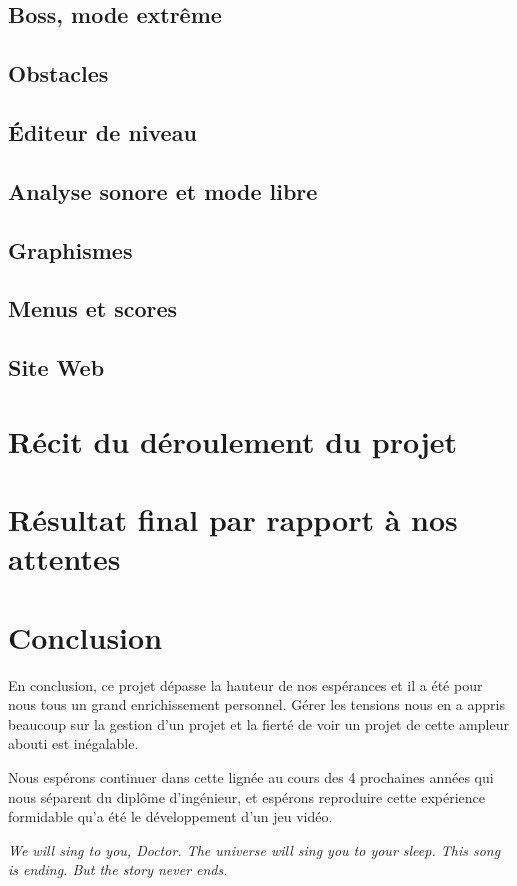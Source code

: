 \documentclass[12pt,a4paper]{article}
\begin{document}
		\subsection{Boss, mode extrême}
			
		\subsection{Obstacles}
			
		\subsection{Éditeur de niveau}
			
		\subsection{Analyse sonore et mode libre}
			
		\subsection{Graphismes}
			
		\subsection{Menus et scores}
			
		\subsection{Site Web}
			
	
	\newpage
	\section{Récit du déroulement du projet}
			
	
	\newpage
	\section{Résultat final par rapport à nos attentes}
		
	
	\newpage
	\section{Conclusion}
		\par En conclusion, ce projet dépasse la hauteur de nos espérances et il a été pour nous tous un grand enrichissement personnel. Gérer les tensions nous en a appris beaucoup sur la gestion d'un projet et la fierté de voir un projet de cette ampleur abouti est inégalable.
		\par Nous espérons continuer dans cette lignée au cours des 4 prochaines années qui nous séparent du diplôme d'ingénieur, et espérons reproduire cette expérience formidable qu'a été le développement d'un jeu vidéo.
		\vspace{2cm}		
		\par \emph{We will sing to you, Doctor. The universe will sing you to your sleep. This song is ending. But the story never ends.}
\end{document}
